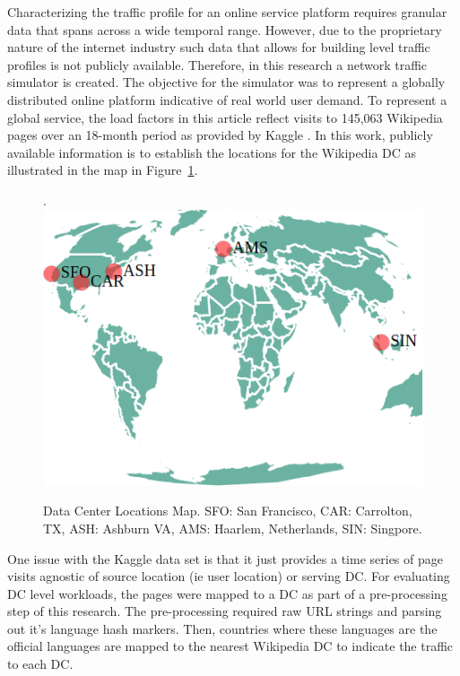  Characterizing the traffic profile for an online service platform requires granular data that spans across a wide temporal range. However, due to the proprietary nature of the internet industry such data that allows for building level traffic profiles is not publicly available. Therefore, in this research a network traffic simulator is created. The objective for the simulator was to represent a globally distributed online platform indicative of real world user demand. To represent a global service, the load factors in this article reflect visits to 145,063 Wikipedia pages over an 18-month period as provided by Kaggle \citep{kaggle17}. In this work, publicly available information is to establish the locations for the Wikipedia DC as illustrated in the map in Figure~\ref{fig:dc_map}.

\begin{figure}[!h].
\centering
\includegraphics[scale=0.45]{img/dc_locations.png}
\caption[DC Locations]{Data Center Locations Map. SFO: San Francisco, CAR: Carrolton, TX, ASH: Ashburn VA, AMS: Haarlem, Netherlands, SIN: Singpore.}
\label{fig:dc_map}
\end{figure}

One issue with the Kaggle data set is that it just provides a time series of page visits agnostic of source location (ie user location) or serving DC. For evaluating DC level workloads, the pages were mapped to a DC  as part of a pre-processing step of this research. The pre-processing required  raw URL strings and parsing out it's language hash markers. Then, countries where these languages are the official languages are mapped to the nearest Wikipedia DC to indicate the traffic to each DC. 

